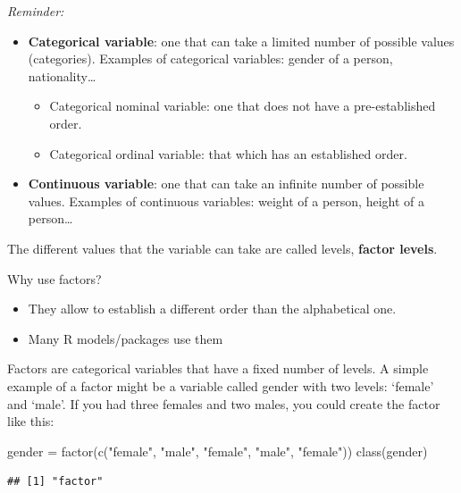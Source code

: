 \documentclass[
]{book}
\newenvironment{Shaded}{\begin{snugshade}}{\end{snugshade}}
\newcommand{\FunctionTok}[1]{\textcolor[rgb]{0.00,0.00,0.00}{#1}}
\newcommand{\NormalTok}[1]{#1}
\newcommand{\OtherTok}[1]{\textcolor[rgb]{0.56,0.35,0.01}{#1}}
\newcommand{\StringTok}[1]{\textcolor[rgb]{0.31,0.60,0.02}{#1}}
\providecommand{\tightlist}{%
  \setlength{\itemsep}{0pt}\setlength{\parskip}{0pt}}
\begin{document}
\emph{Reminder:}

\begin{itemize}
\item
  \textbf{Categorical variable}: one that can take a limited number of possible values (categories). Examples of categorical variables: gender of a person, nationality\ldots{}

  \begin{itemize}
  \tightlist
  \item
    Categorical nominal variable: one that does not have a pre-established order.
  \item
    Categorical ordinal variable: that which has an established order.
  \end{itemize}
\item
  \textbf{Continuous variable}: one that can take an infinite number of possible values. Examples of continuous variables: weight of a person, height of a person\ldots{}
\end{itemize}

The different values that the variable can take are called levels, \textbf{factor levels}.

Why use factors?

\begin{itemize}
\tightlist
\item
  They allow to establish a different order than the alphabetical one.
\item
  Many R models/packages use them
\end{itemize}

Factors are categorical variables that have a fixed number of levels. A simple example of a factor might be a variable called gender with two levels: `female' and `male'. If you had three females and two males, you could create the factor like this:

\begin{Shaded}
\begin{Highlighting}[]
\NormalTok{gender }\OtherTok{=} \FunctionTok{factor}\NormalTok{(}\FunctionTok{c}\NormalTok{(}\StringTok{"female"}\NormalTok{, }\StringTok{"male"}\NormalTok{, }\StringTok{"female"}\NormalTok{, }\StringTok{"male"}\NormalTok{, }\StringTok{"female"}\NormalTok{))}
\FunctionTok{class}\NormalTok{(gender)}
\end{Highlighting}
\end{Shaded}

\begin{verbatim}
## [1] "factor"
\end{verbatim}
\end{document}
